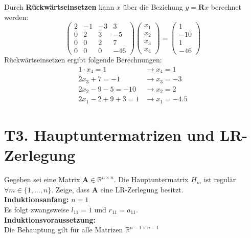 \documentclass[11pt]{article}
\theoremstyle{plain}
\theoremstyle{definition}
\let\mbb\boldsymbol
\renewcommand\boldsymbol{\mbb}
\renewcommand{\a}{\"{a}}
\renewcommand{\u}{\"{u}}
\begin{document}
\begin{itemize}
Durch \textbf{R\u ckw\a rtseinsetzen} kann $x$ \u ber die Beziehung $y=\mbb{R}x$ berechnet werden:
\begin{equation}
\begin{pmatrix}
2 & -1 & -3 & 3 \\
0 & 2 & 3 & -5 \\
0 & 0 & 2 & 7 \\
0 & 0 & 0 & -46
\end{pmatrix}
\begin{pmatrix}
x_1 \\ x_2 \\ x_3 \\ x_4
\end{pmatrix}
=
\begin{pmatrix}
1 \\ -10 \\ 1 \\ -46
\end{pmatrix}
\end{equation}
R\u ckw\a rtseinsetzen ergibt folgende Berechnungen:
\begin{align}
1 \cdot x_4 = 1   &\rightarrow x_4 = 1 \\
2x_3 + 7 = -1      &\rightarrow x_3=-3 \\
2x_2-9-5 =-10     &\rightarrow x_2 = 2 \\
2x_1 -2 + 9 +3 = 1 &\rightarrow x_1 = -4.5
\end{align} 
\end{itemize}

\section*{T3. Hauptuntermatrizen und LR-Zerlegung}
Gegeben sei eine Matrix $\mbb{A}\in \mathbb{R}^{n \times n}$. Die Hauptuntermatrix $H_m$ ist regul\a r $\forall m \in \{1,...,n\}$. Zeige, dass $\mbb{A}$ eine LR-Zerlegung besitzt.\\

\textbf{Induktionsanfang:} $n = 1$ \\
Es folgt zwangsweise $l_{11} = 1$ und $r_{11} = a_{11}$.\\

\textbf{Induktionsvoraussetzung:} \\
Die Behauptung gilt f\u r alle Matrizen $\mathbb{R}^{n-1 \times n-1}$\\
\end{document}
